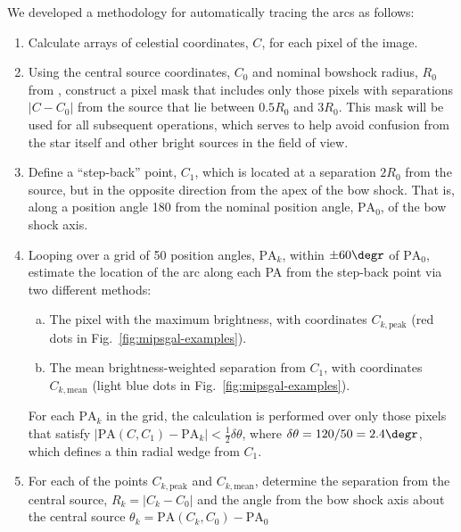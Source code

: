 We developed a methodology for automatically tracing the arcs as follows:
\begin{enumerate}[1.]
\item Calculate arrays of celestial coordinates, \(C\), for each pixel
  of the image.
\item Using the central source coordinates, \(C_0\) and nominal
  bowshock radius, \(R_0\) from \citet{Kobulnicky:2016a}, construct a
  pixel mask that includes only those pixels with separations
  \(|C - C_0|\) from the source that lie between \(0.5 R_0\) and
  \(3 R_0\).  This mask will be used for all subsequent operations,
  which serves to help avoid confusion from the star itself and other
  bright sources in the field of view.
\item Define a ``step-back'' point, \(C_1\), which is located at a
  separation \(2 R_0\) from the source, but in the opposite direction
  from the apex of the bow shock. That is, along a position angle
  180\degr{} from the nominal position angle, \(\text{PA}_0\), of
  the bow shock axis.
\item Looping over a grid of 50 position angles, \(\text{PA}_k\), within
  \(\pm 60\degr\) of \(\text{PA}_0\), estimate the location of the
  arc along each PA from the step-back point via two different methods:
  \begin{enumerate}[(a)]
  \item The pixel with the maximum brightness, with coordinates
    \(C_{k,\text{peak}}\) (red dots in
    Fig.~\ref{fig:mipsgal-examples}).
  \item The mean brightness-weighted separation from \(C_1\), with
    coordinates \(C_{k,\text{mean}}\) (light blue dots in
    Fig.~\ref{fig:mipsgal-examples}).
  \end{enumerate}
  For each \(\text{PA}_k\) in the grid, the calculation is performed
  over only those pixels that satisfy
  \(|\text{PA}(C, C_1) - \text{PA}_k| < \frac12 \delta\theta\), where
  \(\delta\theta = 120/50 = 2.4\degr\), which defines a thin radial wedge from
  \(C_1\).
\item For each of the points \(C_{k,\text{peak}}\) and \(C_{k,\text{mean}}\), determine the separation from the central source, \(R_k = |C_k - C_0|\) and the angle from the bow shock axis about the central source \(\theta_k = \text{PA}(C_k, C_0) - \text{PA}_0\) 

\end{enumerate}





